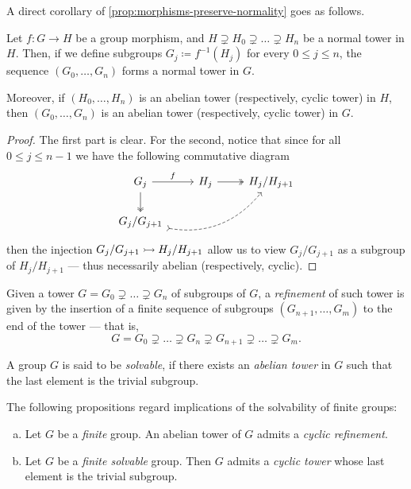 A direct corollary of \cref{prop:morphisms-preserve-normality} goes as follows.

\begin{corollary}
\label{cor:morphism-normal-towers}
Let \(f: G \to H\) be a group morphism, and \(H \supsetneq H_0 \supsetneq \dots
\supsetneq H_n\) be a normal tower in \(H\). Then, if we define subgroups \(G_j
\coloneq f^{-1}(H_j)\) for every \(0 \leq j \leq n\), the sequence \((G_0,
\dots, G_n)\) forms a normal tower in \(G\).

Moreover, if \((H_0, \dots, H_n)\) is an abelian tower (respectively, cyclic
tower) in \(H\), then \((G_0, \dots, G_n)\) is an abelian tower (respectively,
cyclic tower) in \(G\).
\end{corollary}

\begin{proof}
The first part is clear. For the second, notice that since for all \(0 \leq j
\leq n-1\) we have the following commutative diagram
\[
  \begin{tikzcd}
    G_j \ar[d, two heads] \ar[r, "f"] &H_j \ar[r, two heads] & H_j/H_{j+1} \\
    G_j/G_{j+1} \ar[rru, bend right, tail, dashed]
  \end{tikzcd}
\]
then the injection \(G_j/G_{j+1} \rightarrowtail H_j/H_{j+1}\) allow us to view
\(G_j/G_{j+1}\) as a subgroup of \(H_j/H_{j+1}\) --- thus necessarily abelian
(respectively, cyclic).
\end{proof}

\begin{definition}[Refinement]
\label{def:refinement-tower}
Given a tower \(G = G_0 \supsetneq \dots \supsetneq G_n\) of subgroups of \(G\),
a \emph{refinement} of such tower is given by the insertion of a finite
sequence of subgroups \((G_{n+1}, \dots, G_m)\) to the end of the tower --- that
is,
\[
  G = G_{0} \supsetneq \dots \supsetneq G_n \supsetneq G_{n+1} \supsetneq \dots
  \supsetneq G_{m}.
\]
\end{definition}

\begin{definition}
\label{def:solvable-group}
A group \(G\) is said to be \emph{solvable}, if there exists an \emph{abelian
tower} in \(G\) such that the last element is the trivial subgroup.
\end{definition}

\begin{proposition}
\label{prop:finite-grp-cyclic-refinement}
The following propositions regard implications of the solvability of finite
groups:
\begin{enumerate}[(a)]\setlength\itemsep{0em}
\item Let \(G\) be a \emph{finite} group. An abelian tower of \(G\) admits a
  \emph{cyclic refinement}.
\item Let \(G\) be a \emph{finite solvable} group. Then \(G\) admits a
  \emph{cyclic tower} whose last element is the trivial subgroup.
\end{enumerate}
\end{proposition}

